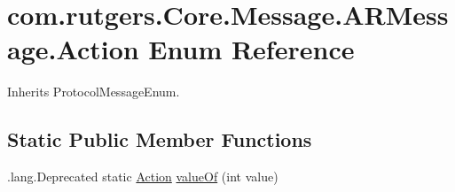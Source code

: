 \hypertarget{enumcom_1_1rutgers_1_1Core_1_1Message_1_1ARMessage_1_1Action}{}\section{com.\+rutgers.\+Core.\+Message.\+A\+R\+Message.\+Action Enum Reference}
\label{enumcom_1_1rutgers_1_1Core_1_1Message_1_1ARMessage_1_1Action}


Inherits Protocol\+Message\+Enum.

\subsection*{Static Public Member Functions}
\begin{DoxyCompactItemize}
\item 
.lang.\+Deprecated static \hyperlink{enumcom_1_1rutgers_1_1Core_1_1Message_1_1ARMessage_1_1Action}{Action} \hyperlink{enumcom_1_1rutgers_1_1Core_1_1Message_1_1ARMessage_1_1Action_a5c2fdd15663f6226c8df2565ea6cf998}{value\+Of} (int value)
\end{DoxyCompactItemize}
